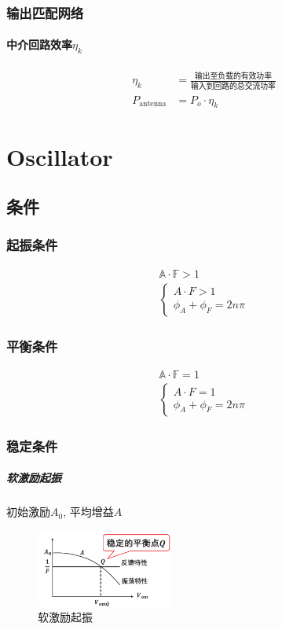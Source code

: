 \documentclass[a4paper]{report}
\begin{document}
\subsection{输出匹配网络}
\subsubsection{中介回路效率$\eta_k$}
\begin{align*}
  \eta_k&=\frac{\text{输出至负载的有效功率}}{\text{输入到回路的总交流功率}}\\
  P_\text{antenna}&=P_o\cdot \eta_k
\end{align*}

\chapter{Oscillator}
\section{条件}
\subsection{起振条件}
\begin{align*}
  \mathbb{A}\cdot\mathbb{F}>1\\
  \begin{cases}
    A\cdot F>1\\
    \phi_A+\phi_F=2n\pi
  \end{cases}
\end{align*}
\subsection{平衡条件}
\begin{align*}
  \mathbb{A}\cdot\mathbb{F}=1\\
  \begin{cases}
    A\cdot F=1\\
    \phi_A+\phi_F=2n\pi
  \end{cases}
\end{align*}
\subsection{稳定条件}
\paragraph{软激励起振} 初始激励$A_0$, 平均增益$A$
\begin{figure}[H]
\centering
\includegraphics[width=0.4\textwidth]{osc_condition_1.png}
\caption{软激励起振}
\end{figure}
\end{document}
